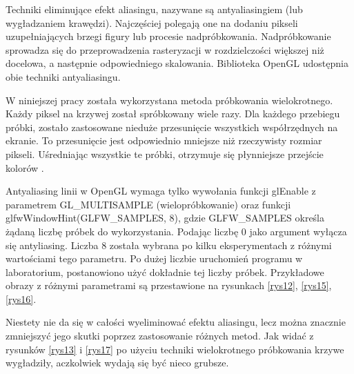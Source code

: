 Techniki eliminujące efekt aliasingu, nazywane są antyaliasingiem (lub wygładzaniem krawędzi). Najczęściej polegają one na dodaniu pikseli uzupełniających brzegi figury lub procesie nadpróbkowania. Nadpróbkowanie sprowadza się do przeprowadzenia rasteryzacji w rozdzielczości większej niż docelowa, a następnie odpowiedniego skalowania. Biblioteka OpenGL udostępnia obie techniki antyaliasingu. 

W niniejszej pracy została wykorzystana metoda próbkowania wielokrotnego. Każdy piksel na krzywej został spróbkowany wiele razy. Dla każdego przebiegu próbki, zostało zastosowane nieduże przesunięcie wszystkich współrzędnych na ekranie. To przesunięcie jest odpowiednio mniejsze niż rzeczywisty rozmiar pikseli. Uśredniając wszystkie te próbki, otrzymuje się płynniejsze przejście kolorów \cite{glfw}. 

Antyaliasing linii w OpenGL wymaga tylko wywołania funkcji glEnable z parametrem GL\_MULTISAMPLE (wielopróbkowanie) oraz funkcji glfwWindowHint(GLFW\_SAMPLES, 8), gdzie GLFW\_SAMPLES określa żądaną liczbę próbek do wykorzystania. Podając liczbę 0 jako argument wyłącza się antyliasing. Liczba 8 została wybrana po kilku eksperymentach z różnymi wartościami tego parametru. Po dużej liczbie uruchomień programu w laboratorium, postanowiono użyć dokładnie tej liczby próbek. Przykładowe obrazy z różnymi parametrami są przestawione na rysunkach \ref{rys12}, \ref{rys15}, \ref{rys16}.

Niestety nie da się w całości wyeliminować efektu aliasingu, lecz można znacznie zmniejszyć jego skutki poprzez zastosowanie różnych metod. Jak widać z rysunków \ref{rys13} i \ref{rys17} po użyciu techniki wielokrotnego próbkowania krzywe wygładziły, aczkolwiek wydają się być nieco grubsze.

